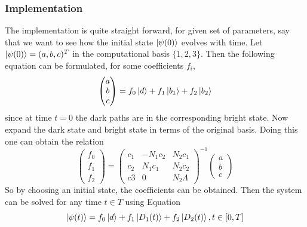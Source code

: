 \subsubsection{Implementation}
The implementation is quite straight forward, for given set of parameters, say that we want to see how the initial state $\ket{\psi(0)}$ evolves with time.
Let $\ket{\psi(0)} = (a,b,c)^T$ in the computational basis $\{1,2,3\}$. Then the following equation can be formulated, for some coefficients $f_i$,
\begin{equation}
\begin{pmatrix}
a\\
b\\
c
\end{pmatrix}
= f_0 \ket{d} + f_1\ket{b_1} + f_2\ket{b_2}
\end{equation}
since at time $t = 0$ the dark paths are in the corresponding bright state.
Now expand the dark state and bright state in terms of the original basis. Doing this one can obtain the relation
\begin{equation}
\begin{pmatrix}
f_0\\
f_1\\
f_2
\end{pmatrix} = \begin{pmatrix}
c_1 & -N_1 c_2 & N_2 c_1
\\
c_2 & N_1 c_1 & N_2 c_2
\\
c3 & 0 & N_2 \Lambda
\end{pmatrix}^{-1}\begin{pmatrix}
a\\
b\\
c
\end{pmatrix}
\end{equation}
So by choosing an initial state, the coefficients can be obtained.
Then the system can be solved for any time $t \in T$ using Equation 
\begin{equation}
\label{eq:expl-time}
\ket{\psi(t)} = f_0\ket{d} + f_1\ket{D_1(t)} + f_2\ket{D_2(t)}, t \in [0,T]
\end{equation}



